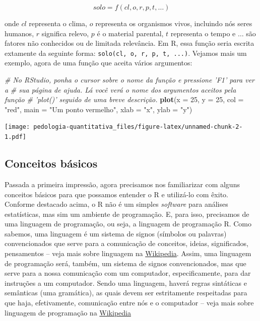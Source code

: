\documentclass[]{book}
\newenvironment{Shaded}{\begin{snugshade}}{\end{snugshade}}
\newcommand{\KeywordTok}[1]{\textcolor[rgb]{0.13,0.29,0.53}{\textbf{{#1}}}}
\newcommand{\DataTypeTok}[1]{\textcolor[rgb]{0.13,0.29,0.53}{{#1}}}
\newcommand{\DecValTok}[1]{\textcolor[rgb]{0.00,0.00,0.81}{{#1}}}
\newcommand{\StringTok}[1]{\textcolor[rgb]{0.31,0.60,0.02}{{#1}}}
\newcommand{\CommentTok}[1]{\textcolor[rgb]{0.56,0.35,0.01}{\textit{{#1}}}}
\newcommand{\NormalTok}[1]{{#1}}
\begin{document}
\[solo = f(cl, o, r, p, t, \ldots)\]

onde \(cl\) representa o clima, \(o\) representa os organismos vivos,
incluindo nós seres humanos, \(r\) significa relevo, \(p\) é o material
parental, \(t\) representa o tempo e \(\ldots\) são fatores não
conhecidos ou de limitada relevância. Em R, essa função seria escrita
extamente da seguinte forma: \texttt{solo(cl,\ o,\ r,\ p,\ t,\ ...)}.
Vejamos mais um exemplo, agora de uma função que aceita vários
argumentos:

\begin{Shaded}
\begin{Highlighting}[]
\CommentTok{# No RStudio, ponha o cursor sobre o nome da função e pressione 'F1' para ver a }
\CommentTok{# sua página de ajuda. Lá você verá o nome dos argumentos aceitos pela função }
\CommentTok{# 'plot()' seguido de uma breve descrição.}
\KeywordTok{plot}\NormalTok{(}\DataTypeTok{x =} \DecValTok{25}\NormalTok{, }\DataTypeTok{y =} \DecValTok{25}\NormalTok{, }\DataTypeTok{col =} \StringTok{"red"}\NormalTok{, }\DataTypeTok{main =} \StringTok{"Um ponto vermelho"}\NormalTok{, }\DataTypeTok{xlab =} \StringTok{"x"}\NormalTok{, }\DataTypeTok{ylab =} \StringTok{"y"}\NormalTok{)}
\end{Highlighting}
\end{Shaded}

\texttt{[image: pedologia-quantitativa\_files/figure-latex/unnamed-chunk-2-1.pdf]}

\subsection{Conceitos básicos}\label{conceitos-basicos}

Passada a primeira impressão, agora precisamos nos familiarizar com
alguns conceitos básicos para que possamos entender o R e utilizá-lo com
êxito. Conforme destacado acima, o R não é um simples \emph{software}
para análises estatísticas, mas sim um ambiente de programação. E, para
isso, precisamos de uma linguagem de programação, ou seja, a linguagem
de programação R. Como sabemos, uma linguagem é um sistema de signos
(símbolos ou palavras) convencionados que serve para a comunicação de
conceitos, ideias, significados, pensamentos -- veja mais sobre
linguagem na
\href{\%22https://pt.wikipedia.org/wiki/Linguagem\%22}{Wikipedia}.
Assim, uma linguagem de programação será, também, um sistema de signos
convencionados, mas que serve para a nossa comunicação com um
computador, especificamente, para dar instruções a um computador. Sendo
uma linguagem, haverá regras sintáticas e semânticas (uma gramática), as
quais devem ser estritamente respeitadas para que haja, efetivamente,
comunicação entre nós e o computador -- veja mais sobre linguagem de
programação na
\href{https://pt.wikipedia.org/wiki/Linguagem_de_programa\%C3\%A7\%C3\%A3o}{Wikipedia}
\end{document}
